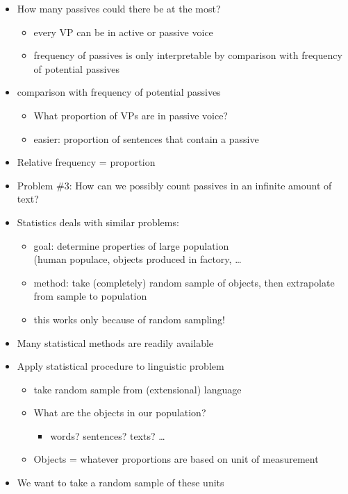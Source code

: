 \documentclass[a4paper,landscape,headrule,footrule,xetex]{foils}
\begin{document}
\begin{itemize}
\item How many passives could there be at the most?
\begin{itemize}
\item every VP can be in active or passive voice
\item frequency of passives is only interpretable by
comparison with frequency of potential passives
\end{itemize}
\item comparison with frequency of potential passives
\begin{itemize}
\item What proportion of VPs are in passive voice?
\item easier: proportion of sentences that contain a passive
\end{itemize}
\item Relative frequency = proportion \txx{$\mathbf{\pi}$}
\end{itemize}


\begin{itemize}
\item Problem \#3: How can we possibly count
passives in an infinite amount of text?
\item Statistics deals with similar problems:
\begin{itemize}
\item goal: determine properties of large population
\\(human populace, objects produced in factory, \ldots
\item method: take (completely) random sample of
objects, then extrapolate from sample to population
\item this works only because of random sampling!
\end{itemize}
\item Many statistical methods are readily available
\end{itemize}


\begin{itemize}
\item Apply statistical procedure to linguistic problem
  \begin{itemize}
  \item take random sample from (extensional) language
  \item What are the objects in our population?
    \begin{itemize}
    \item words? sentences? texts? …
    \end{itemize}
  \item Objects = whatever proportions are based on
    \into unit of measurement
  \end{itemize}
\item We want to take a random sample of these units
\end{itemize}
\end{document}

